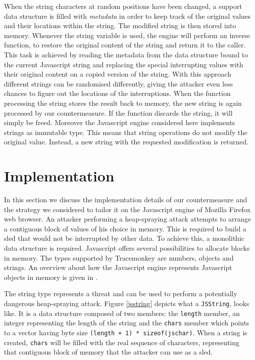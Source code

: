 When the string characters at random positions have been changed, a support data structure is filled with \textit{metadata} in order to keep track of the original values and their locations within the string. The modified string is then stored into memory. Whenever the string variable is used, the engine will perform an inverse function, to restore the original content of the string and return it to the caller. This task is achieved by reading the metadata from the data structure bound to the current Javascript string and replacing the special interrupting values with their original content on a copied version of the string. With this approach different strings can be randomised differently, giving the attacker even less chances to figure out the locations of the interruptions. 
When the function processing the string stores the result back to memory, the new string is again processed by our countermeasure. If the function discards the string, it will simply be freed. Moreover the Javascript engine considered here implements strings as immutable type. This means that string operations do not modify the original value. Instead, a new string with the requested modification is returned.  


\section{Implementation}\label{bub:implementation}
In this section we discuss the implementation details of our countermeasure and the strategy we considered to tailor it on the Javascript engine of Mozilla Firefox web browser.
An attacker performing a heap-spraying attack attempts to arrange a contiguous block of values of his choice in memory. This is required to build a sled that would not be interrupted by other data. To achieve this, a monolithic data structure is required.
Javascript offers several possibilities to allocate blocks in memory. The types supported by Tracemonkey are numbers, objects and strings. An overview about how the Javascript engine represents Javascript objects in memory is given in \cite{jsobj}. 

The string type represents a threat and can be used to perform a potentially dangerous heap-spraying attack. Figure \ref{jsstring} depicts what a \texttt{JSString}, looks like.  It is a data structure composed of two members: the \texttt{length} member, an integer representing the length of the string and the \texttt{chars} member which points to a vector having byte size \texttt{(length + 1) * sizeof(jschar)}. When a string is created, \texttt{chars} will be filled with the real sequence of characters, representing that contiguous block of memory that the attacker can use as a sled. 

